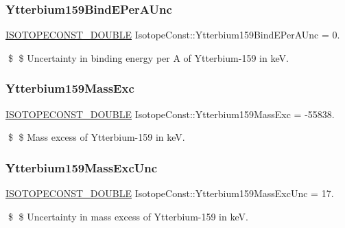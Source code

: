 \subsubsection{\texorpdfstring{Ytterbium159\+Bind\+E\+Per\+A\+Unc}{Ytterbium159BindEPerAUnc}}
{\footnotesize\ttfamily \mbox{\hyperlink{group___isotope_const-_macros_ga8f45a7272ce02c0b4c65c44636ed719a}{I\+S\+O\+T\+O\+P\+E\+C\+O\+N\+S\+T\+\_\+\+D\+O\+U\+B\+LE}} Isotope\+Const\+::\+Ytterbium159\+Bind\+E\+Per\+A\+Unc = 0.}

\$ \$ Uncertainty in binding energy per A of Ytterbium-\/159 in keV. \mbox{\label{group___isotope_const-_ytterbium-_yb159_ga84383c67669e3428209be6db05aad699}} 
\subsubsection{\texorpdfstring{Ytterbium159\+Mass\+Exc}{Ytterbium159MassExc}}
{\footnotesize\ttfamily \mbox{\hyperlink{group___isotope_const-_macros_ga8f45a7272ce02c0b4c65c44636ed719a}{I\+S\+O\+T\+O\+P\+E\+C\+O\+N\+S\+T\+\_\+\+D\+O\+U\+B\+LE}} Isotope\+Const\+::\+Ytterbium159\+Mass\+Exc = -\/55838.}

\$ \$ Mass excess of Ytterbium-\/159 in keV. \mbox{\label{group___isotope_const-_ytterbium-_yb159_gac594cd025914ae5ab476cc5567b4f46e}} 
\subsubsection{\texorpdfstring{Ytterbium159\+Mass\+Exc\+Unc}{Ytterbium159MassExcUnc}}
{\footnotesize\ttfamily \mbox{\hyperlink{group___isotope_const-_macros_ga8f45a7272ce02c0b4c65c44636ed719a}{I\+S\+O\+T\+O\+P\+E\+C\+O\+N\+S\+T\+\_\+\+D\+O\+U\+B\+LE}} Isotope\+Const\+::\+Ytterbium159\+Mass\+Exc\+Unc = 17.}

\$ \$ Uncertainty in mass excess of Ytterbium-\/159 in keV. \mbox{\label{group___isotope_const-_ytterbium-_yb159_ga99b4e1a45dd2f1513c766ee025e94d7b}} 

